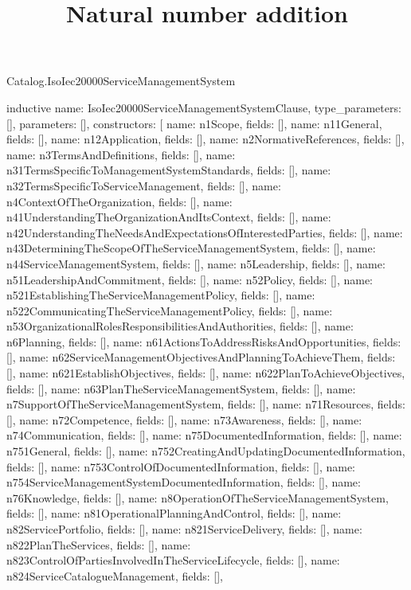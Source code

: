 \begin{lexlean}{Catalog.IsoIec20000ServiceManagementSystem}
\title{Natural number addition}
\begin{semanticmodule}
inductive{
  name: IsoIec20000ServiceManagementSystemClause,
  type_parameters: [],
  parameters: [],
  constructors: [
    {name: n1Scope, fields: []},
    {name: n11General, fields: []},
    {name: n12Application, fields: []},
    {name: n2NormativeReferences, fields: []},
    {name: n3TermsAndDefinitions, fields: []},
    {name: n31TermsSpecificToManagementSystemStandards, fields: []},
    {name: n32TermsSpecificToServiceManagement, fields: []},
    {name: n4ContextOfTheOrganization, fields: []},
    {name: n41UnderstandingTheOrganizationAndItsContext, fields: []},
    {name: n42UnderstandingTheNeedsAndExpectationsOfInterestedParties, fields: []},
    {name: n43DeterminingTheScopeOfTheServiceManagementSystem, fields: []},
    {name: n44ServiceManagementSystem, fields: []},
    {name: n5Leadership, fields: []},
    {name: n51LeadershipAndCommitment, fields: []},
    {name: n52Policy, fields: []},
    {name: n521EstablishingTheServiceManagementPolicy, fields: []},
    {name: n522CommunicatingTheServiceManagementPolicy, fields: []},
    {name: n53OrganizationalRolesResponsibilitiesAndAuthorities, fields: []},
    {name: n6Planning, fields: []},
    {name: n61ActionsToAddressRisksAndOpportunities, fields: []},
    {name: n62ServiceManagementObjectivesAndPlanningToAchieveThem, fields: []},
    {name: n621EstablishObjectives, fields: []},
    {name: n622PlanToAchieveObjectives, fields: []},
    {name: n63PlanTheServiceManagementSystem, fields: []},
    {name: n7SupportOfTheServiceManagementSystem, fields: []},
    {name: n71Resources, fields: []},
    {name: n72Competence, fields: []},
    {name: n73Awareness, fields: []},
    {name: n74Communication, fields: []},
    {name: n75DocumentedInformation, fields: []},
    {name: n751General, fields: []},
    {name: n752CreatingAndUpdatingDocumentedInformation, fields: []},
    {name: n753ControlOfDocumentedInformation, fields: []},
    {name: n754ServiceManagementSystemDocumentedInformation, fields: []},
    {name: n76Knowledge, fields: []},
    {name: n8OperationOfTheServiceManagementSystem, fields: []},
    {name: n81OperationalPlanningAndControl, fields: []},
    {name: n82ServicePortfolio, fields: []},
    {name: n821ServiceDelivery, fields: []},
    {name: n822PlanTheServices, fields: []},
    {name: n823ControlOfPartiesInvolvedInTheServiceLifecycle, fields: []},
    {name: n824ServiceCatalogueManagement, fields: []},
}
\end{semanticmodule}
\end{lexlean}
